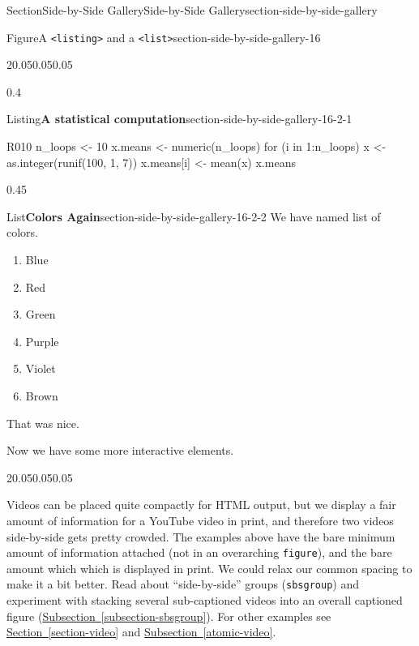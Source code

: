 \documentclass[twoside,10pt,]{article}
\newcommand{\xreffont}{\relax}
\newcommand{\mono}[1]{\texttt{#1}}
\numberwithin{equation}{section}
\begin{document}
\begin{sectionptx}{Section}{Side-by-Side Gallery}{}{Side-by-Side Gallery}{}{}{section-side-by-side-gallery}
\begin{figureptx}{Figure}{A \mono{<listing>} and a \mono{<list>}}{section-side-by-side-gallery-16}{}
\begin{sidebyside}{2}{0.05}{0.05}{0.05}
\begin{sbspanel}{0.4}
\begin{sublistingptx}{Listing}{\textbf{A statistical computation}}{section-side-by-side-gallery-16-2-1}{}
\begin{program}{R}{0}{1}{0}
n_loops <- 10
x.means <- numeric(n_loops)
for (i in 1:n_loops){
    x <- as.integer(runif(100, 1, 7))
    x.means[i] <- mean(x)
}
x.means
\end{program}
\tcblower
\end{sublistingptx}%
\end{sbspanel}%
\begin{sbspanel}{0.45}%
\begin{sublistptx}{List}{\textbf{Colors Again}}{section-side-by-side-gallery-16-2-2}{}%
We have named list of colors.%
%
\begin{enumerate}
\item{}Blue%
\item{}Red%
\item{}Green%
\item{}Purple%
\item{}Violet%
\item{}Brown%
\end{enumerate}
That was nice.%
\tcblower
\end{sublistptx}%
\end{sbspanel}%
\end{sidebyside}%
\tcblower
\end{figureptx}%
Now we have some more interactive elements.%
\begin{sidebyside}{2}{0.05}{0.05}{0.05}%
\end{sidebyside}%
\par
Videos can be placed quite compactly for HTML output, but we display a fair amount of information for a YouTube video in print, and therefore two videos side-by-side gets pretty crowded.  The examples above have the bare minimum amount of information attached (not in an overarching \mono{figure}), and the bare amount which which is displayed in print.  We could relax our common spacing to make it a bit better.  Read about ``side-by-side'' groups (\mono{sbsgroup}) and experiment with stacking several sub-captioned videos into an overall captioned figure (\hyperref[subsection-sbsgroup]{Subsection~{\xreffont\ref{subsection-sbsgroup}}}).  For other examples see \hyperref[section-video]{Section~{\xreffont\ref{section-video}}} and \hyperref[atomic-video]{Subsection~{\xreffont\ref{atomic-video}}}.%
\end{sectionptx}
%
%
\typeout{************************************************}
\typeout{************************************************}
%
\end{document}

